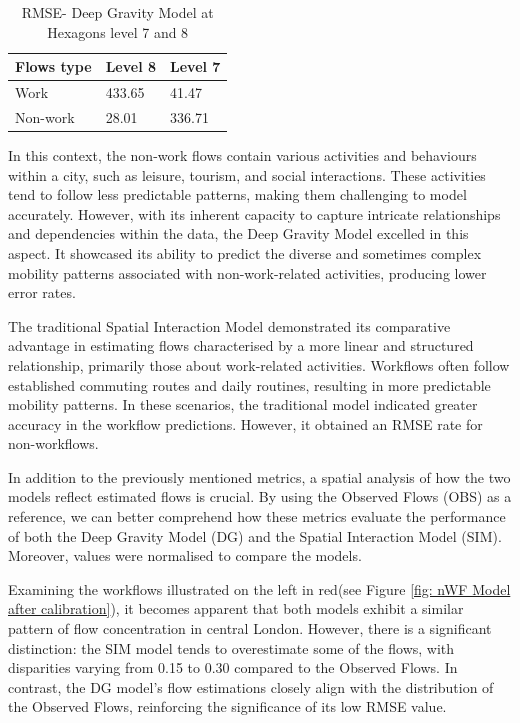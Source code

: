         \begin{table}[H]
        \centering
        \begin{tabular}{@{}lll@{}}
        \toprule
        \textbf{Flows type} & \textbf{Level 8} & \textbf{Level 7} \\ \midrule
        Work                & 433.65                & 41.47                          \\
        Non-work            & 28.01                 & 336.71                          \\ \bottomrule
        \end{tabular}
            \caption{RMSE- Deep Gravity Model at Hexagons level 7 and 8}
            \label{table: RMSE_DG}
        \end{table}
    
    
    In this context, the non-work flows contain various activities and behaviours within a city, such as leisure, tourism, and social interactions. These activities tend to follow less predictable patterns, making them challenging to model accurately. However, with its inherent capacity to capture intricate relationships and dependencies within the data, the Deep Gravity Model excelled in this aspect. It showcased its ability to predict the diverse and sometimes complex mobility patterns associated with non-work-related activities, producing lower error rates.
    
    The traditional Spatial Interaction Model demonstrated its comparative advantage in estimating flows characterised by a more linear and structured relationship, primarily those about work-related activities. Workflows often follow established commuting routes and daily routines, resulting in more predictable mobility patterns. In these scenarios, the traditional model indicated greater accuracy in the workflow predictions. However, it obtained an RMSE rate for non-workflows.
        
    In addition to the previously mentioned metrics, a spatial analysis of how the two models reflect estimated flows is crucial. By using the Observed Flows (OBS) as a reference, we can better comprehend how these metrics evaluate the performance of both the Deep Gravity Model (DG) and the Spatial Interaction Model (SIM). Moreover, values were normalised to compare the models.

    Examining the workflows illustrated on the left in red(see Figure \ref{fig: nWF Model after calibration}), it becomes apparent that both models exhibit a similar pattern of flow concentration in central London. However, there is a significant distinction: the SIM model tends to overestimate some of the flows, with disparities varying from 0.15 to 0.30 compared to the Observed Flows. In contrast, the DG model's flow estimations closely align with the distribution of the Observed Flows, reinforcing the significance of its low RMSE value.
        

